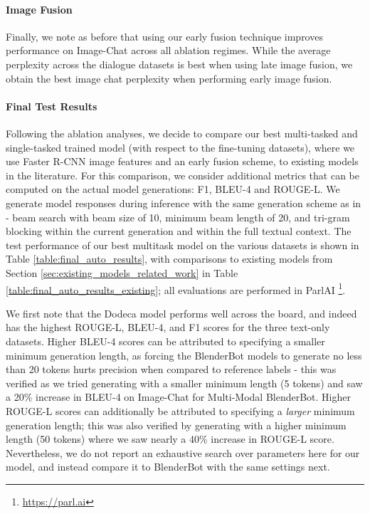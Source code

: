 \documentclass[11pt,a4paper]{article}
\begin{document}
\paragraph{Image Fusion}
Finally, we note as before that using our early fusion technique improves performance on Image-Chat across all ablation regimes. While the average perplexity across the dialogue datasets is best when using late image fusion, we obtain the best image chat perplexity when performing early image fusion.

\paragraph{Final Test Results}
Following the ablation analyses, we decide to compare our best multi-tasked and single-tasked trained model (with respect to the fine-tuning datasets), where we use Faster R-CNN image features and an early fusion scheme, to existing models in the literature.  For this comparison, we consider additional metrics that can be computed on the actual model generations: F1, BLEU-4 and ROUGE-L. We generate model responses during inference with the same generation scheme as in \citet{roller2020recipes} - beam search with beam size of 10, minimum beam length of 20, and tri-gram blocking within the current generation and within the full textual context. The test performance of our best multitask model on the various datasets is shown in Table \ref{table:final_auto_results}, with comparisons to existing models from Section \ref{sec:existing_models_related_work} in Table \ref{table:final_auto_results_existing}; all evaluations are performed in ParlAI \footnote{\url{https://parl.ai}}.

We first note that the Dodeca model performs well across the board, and indeed has the highest ROUGE-L, BLEU-4, and F1 scores for the three text-only datasets. Higher BLEU-4 scores can be attributed to specifying a smaller minimum generation length, as forcing the BlenderBot models to generate no less than 20 tokens hurts precision when compared to reference labels - this was verified as we tried generating with a smaller minimum length (5 tokens) and saw a 20\% increase in BLEU-4 on Image-Chat for Multi-Modal BlenderBot. Higher ROUGE-L scores can additionally be attributed to specifying a \textit{larger} minimum generation length; this was also verified by generating with a higher minimum length (50 tokens) where we saw nearly a 40\% increase in ROUGE-L score.
Nevertheless, we do not report an exhaustive search over parameters here for our model, and instead compare it to BlenderBot with the same settings next.
\end{document}
